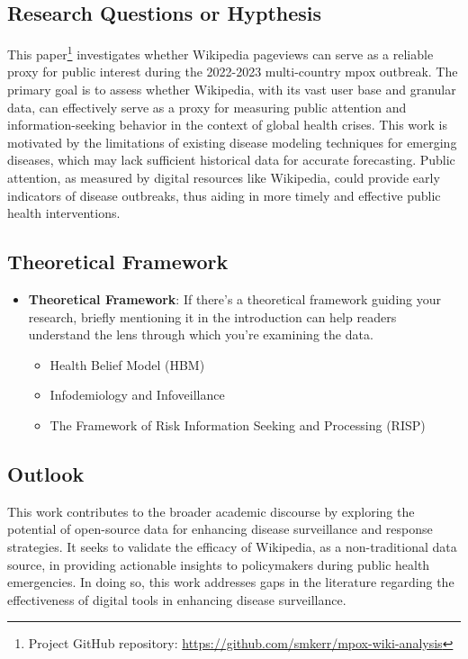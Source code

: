 \documentclass[
  12pt,
]{article}
\begin{document}
\subsection{Research Questions or
Hypthesis}\label{research-questions-or-hypthesis}

This paper\footnote{Project GitHub repository:
  \url{https://github.com/smkerr/mpox-wiki-analysis}} investigates
whether Wikipedia pageviews can serve as a reliable proxy for public
interest during the 2022-2023 multi-country mpox outbreak. The primary
goal is to assess whether Wikipedia, with its vast user base and
granular data, can effectively serve as a proxy for measuring public
attention and information-seeking behavior in the context of global
health crises. This work is motivated by the limitations of existing
disease modeling techniques for emerging diseases, which may lack
sufficient historical data for accurate forecasting. Public attention,
as measured by digital resources like Wikipedia, could provide early
indicators of disease outbreaks, thus aiding in more timely and
effective public health interventions.

\subsection{Theoretical Framework}\label{theoretical-framework}

\begin{itemize}
\item
  \textbf{Theoretical Framework}: If there's a theoretical framework
  guiding your research, briefly mentioning it in the introduction can
  help readers understand the lens through which you're examining the
  data.

  \begin{itemize}
  \item
    Health Belief Model (HBM)
  \item
    Infodemiology and Infoveillance
  \item
    The Framework of Risk Information Seeking and Processing (RISP)
  \end{itemize}
\end{itemize}

\subsection{Outlook}\label{outlook}

This work contributes to the broader academic discourse by exploring the
potential of open-source data for enhancing disease surveillance and
response strategies. It seeks to validate the efficacy of Wikipedia, as
a non-traditional data source, in providing actionable insights to
policymakers during public health emergencies. In doing so, this work
addresses gaps in the literature regarding the effectiveness of digital
tools in enhancing disease surveillance.
\end{document}
